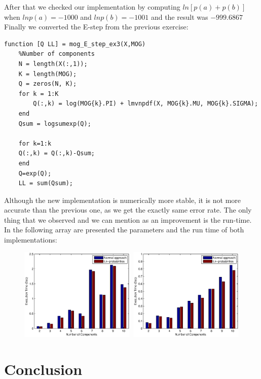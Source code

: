 \documentclass[a4paper,11pt]{article}
\begin{document}
After that we checked our implementation by computing $ln[p(a) + p(b)]$ when $ln p(a) = -1000$ and $ln p(b) = -1001$ and the result was $-999.6867$\\

Finally we converted the E-step from the previous exercise:
\begin{verbatim}
function [Q LL] = mog_E_step_ex3(X,MOG)
    %Number of components
    N = length(X(:,1));
    K = length(MOG);
    Q = zeros(N, K);
    for k = 1:K
        Q(:,k) = log(MOG{k}.PI) + lmvnpdf(X, MOG{k}.MU, MOG{k}.SIGMA);
    end
    Qsum = logsumexp(Q);
    
    for k=1:k
    Q(:,k) = Q(:,k)-Qsum;
    end
    Q=exp(Q);
    LL = sum(Qsum);
\end{verbatim} 

Although the new implementation is numerically more stable, it is not more accurate than the previous one, as we get the exactly same error rate. The only thing that we observed and we can mention as an improvement is the run-time. In the following array are presented the parameters and the run time of both implementations:


\begin{figure}[t!]
  \centering   
      \includegraphics[width=0.49\textwidth]{figures/BananaTime.eps}\	
      \includegraphics[width=0.49\textwidth]{figures/SpiralTime.eps}   
  \caption{}
  \label{timeComp}
\end{figure}



\newpage
\section*{Conclusion}
\newpage
\end{document}
